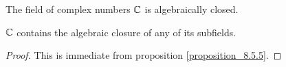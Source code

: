 \begin{theorem}\label{theorem_8.5.7}
  The field of complex numbers $\mathbb{C}$ is algebraically closed.
\end{theorem}
\begin{corollary}
  $\mathbb{C}$ contains the algebraic closure of any of its subfields.
\end{corollary}
\begin{proof}
  This is immediate from proposition \ref{proposition_8.5.5}.
\end{proof}
